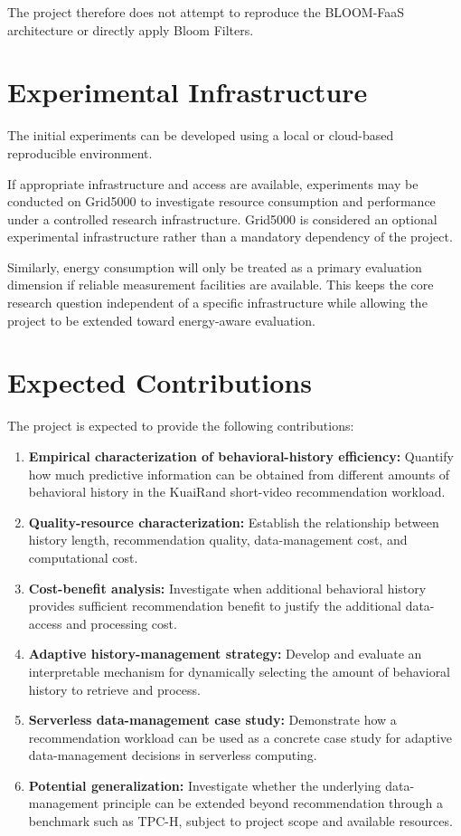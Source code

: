 \documentclass[12pt,a4paper]{article}
\begin{document}
The project therefore does not attempt to reproduce the BLOOM-FaaS architecture or directly apply Bloom Filters.

\section{Experimental Infrastructure}

The initial experiments can be developed using a local or cloud-based reproducible environment.

If appropriate infrastructure and access are available, experiments may be conducted on Grid5000 to investigate resource consumption and performance under a controlled research infrastructure. Grid5000 is considered an optional experimental infrastructure rather than a mandatory dependency of the project.

Similarly, energy consumption will only be treated as a primary evaluation dimension if reliable measurement facilities are available. This keeps the core research question independent of a specific infrastructure while allowing the project to be extended toward energy-aware evaluation.

\section{Expected Contributions}

The project is expected to provide the following contributions:
\begin{enumerate}
    \item \textbf{Empirical characterization of behavioral-history efficiency:} Quantify how much predictive information can be obtained from different amounts of behavioral history in the KuaiRand short-video recommendation workload.
    \item \textbf{Quality-resource characterization:} Establish the relationship between history length, recommendation quality, data-management cost, and computational cost.
    \item \textbf{Cost-benefit analysis:} Investigate when additional behavioral history provides sufficient recommendation benefit to justify the additional data-access and processing cost.
    \item \textbf{Adaptive history-management strategy:} Develop and evaluate an interpretable mechanism for dynamically selecting the amount of behavioral history to retrieve and process.
    \item \textbf{Serverless data-management case study:} Demonstrate how a recommendation workload can be used as a concrete case study for adaptive data-management decisions in serverless computing.
    \item \textbf{Potential generalization:} Investigate whether the underlying data-management principle can be extended beyond recommendation through a benchmark such as TPC-H, subject to project scope and available resources.
\end{enumerate}
\end{document}
